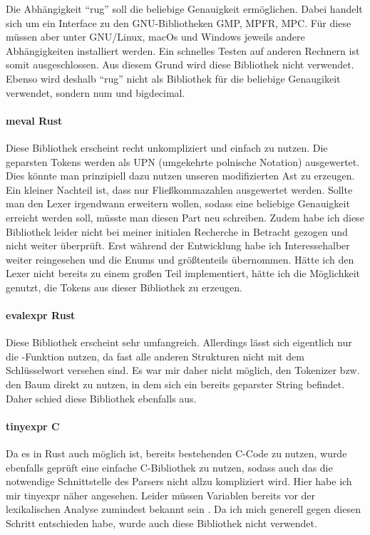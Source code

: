 \documentclass[11pt,a4paper, ngerman]{article}
\begin{document}
Die Abhängigkeit ``rug'' soll die beliebige Genauigkeit ermöglichen. Dabei handelt sich um ein Interface zu den GNU-Bibliotheken GMP, MPFR, MPC. Für diese müssen aber unter GNU/Linux, macOs und Windows jeweils andere Abhängigkeiten installiert werden. Ein schnelles Testen auf anderen Rechnern ist somit ausgeschlossen. Aus diesem Grund wird diese Bibliothek nicht verwendet. Ebenso wird deshalb ``rug'' nicht als Bibliothek für die beliebige Genaugikeit verwendet, sondern num und bigdecimal.

\paragraph{meval Rust} \cite{CrateMeval} Diese Bibliothek erscheint recht unkompliziert und einfach zu nutzen. Die geparsten Tokens werden als UPN (umgekehrte polnische Notation) ausgewertet. Dies könnte man prinzipiell dazu nutzen unseren modifizierten Ast zu erzeugen. Ein kleiner Nachteil ist, dass nur Fließkommazahlen ausgewertet werden. Sollte man den Lexer irgendwann erweitern wollen, sodass eine beliebige Genauigkeit erreicht werden soll, müsste man diesen Part neu schreiben. Zudem habe ich diese Bibliothek leider nicht bei meiner initialen Recherche in Betracht gezogen und nicht weiter überprüft. Erst während der Entwicklung habe ich Interessehalber weiter reingesehen und die Enums  und  größtenteils übernommen. Hätte ich den Lexer nicht bereits zu einem großen Teil implementiert, hätte ich die Möglichkeit genutzt, die Tokens aus dieser Bibliothek zu erzeugen.

\paragraph{evalexpr Rust} \cite{CrateEvalexpr} Diese Bibliothek erscheint sehr umfangreich. Allerdings lässt sich eigentlich nur die -Funktion nutzen, da fast alle anderen Strukturen nicht mit dem Schlüsselwort  versehen sind. Es war mir daher nicht möglich, den Tokenizer bzw. den Baum direkt zu nutzen, in dem sich ein bereits geparster String befindet. Daher schied diese Bibliothek ebenfalls aus.

\paragraph{tinyexpr C} \cite{CTinyexpr} Da es in Rust auch möglich ist, bereits bestehenden C-Code zu nutzen, wurde ebenfalls geprüft eine einfache C-Bibliothek zu nutzen, sodass auch das die notwendige Schnittstelle des Parsers nicht allzu kompliziert wird. Hier habe ich mir tinyexpr näher angesehen. Leider müssen Variablen bereits vor der lexikalischen Analyse zumindest bekannt sein \cite{CTinyexprReadme}. Da ich mich generell gegen diesen Schritt entschieden habe, wurde auch diese Bibliothek nicht verwendet.
\end{document}
